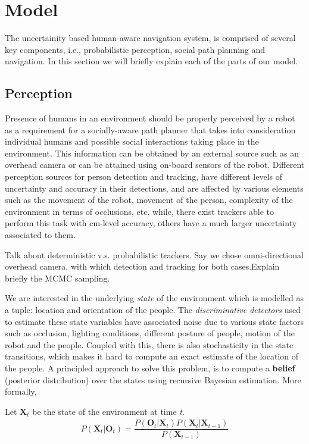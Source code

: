 \section{Model}
\label{sec:model}
The uncertainity based human-aware navigation system, is comprised of several key components, i.e., probabilistic perception, social path planning and navigation. In this section we will briefly explain each of the parts of our model.

\subsection{Perception}

Presence of humans in an environment should be properly perceived by a robot as a requirement for a socially-aware path planner that takes into consideration individual humans and possible social interactions taking place in the environment. This information can be obtained by an external source such as an overhead camera or can be attained using on-board sensors of the robot. Different perception sources for person detection and tracking, have different levels of uncertainty and accuracy in their detections, and are affected by various elements such as the movement of the robot, movement of the person, complexity of the environment in terms of occlusions, etc. while, there exist trackers able to perform this task with cm-level accuracy, others have a much larger uncertainty associated to them. 

Talk about deterministic v.s. probabilistic trackers. 
Say we chose omni-directional overhead camera, with which detection and tracking for both cases.Explain briefly the MCMC sampling.

We are interested in the underlying \textit{state} of the environment which is modelled as a tuple: location and orientation of the people. The \textit{discriminative detectors} used to estimate these state variables have associated noise due to various state factors such as occlusion, lighting conditions, different posture of people, motion of the robot and the people. Coupled with this, there is also stochasticity in the state transitions, which makes it hard to compute an exact estimate of the location of the people. A principled approach to solve this problem, is to compute a \textbf{belief} (posterior distribution) over the states using recursive Bayesian estimation. More formally,

Let $\textbf{X}_{t}$ be the state of the environment at time \textit{t}.
\begin{align}
P(\textbf{X}_{t} | \textbf{O}_{t}) = \dfrac{P(\textbf{O}_{t} | \textbf{X}_{t}) P(\textbf{X}_{t}|\textbf{X}_{t-1})} {P(\textbf{X}_{t-1})}
\end{align} 

